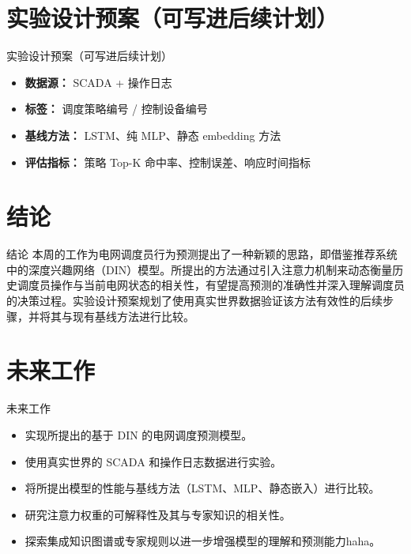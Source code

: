 \documentclass[11pt]{beamer}
\begin{document}
\section{实验设计预案（可写进后续计划）}

\begin{frame}{实验设计预案（可写进后续计划）}
 \begin{itemize}
  \item \textbf{数据源：} SCADA + 操作日志
  \item \textbf{标签：} 调度策略编号 / 控制设备编号
  \item \textbf{基线方法：} LSTM、纯 MLP、静态 embedding 方法
  \item \textbf{评估指标：} 策略 Top-K 命中率、控制误差、响应时间指标
 \end{itemize}
\end{frame}

\section{结论}

\begin{frame}{结论}
 本周的工作为电网调度员行为预测提出了一种新颖的思路，即借鉴推荐系统中的深度兴趣网络（DIN）\cite{raffel2020exploring}模型\cite{wang2013learning}。所提出的方法通过引入注意力机制来动态衡量历史调度员操作与当前电网状态的相关性，有望提高预测的准确性并深入理解调度员的决策过程。实验设计预案规划了使用真实世界数据验证该方法有效性的后续步骤，并将其与现有基线方法进行比较。
\end{frame}

\section{未来工作}

\begin{frame}{未来工作}
 \begin{itemize}
  \item 实现所提出的基于 DIN 的电网调度预测模型。
  \item 使用真实世界的 SCADA 和操作日志数据进行实验。
  \item 将所提出模型的性能与基线方法（LSTM、MLP、静态嵌入）进行比较。
  \item 研究注意力权重的可解释性及其与专家知识的相关性。
  \item 探索集成知识图谱或专家规则以进一步增强模型的理解和预测能力haha。
 \end{itemize}
\end{frame}
\end{document}
